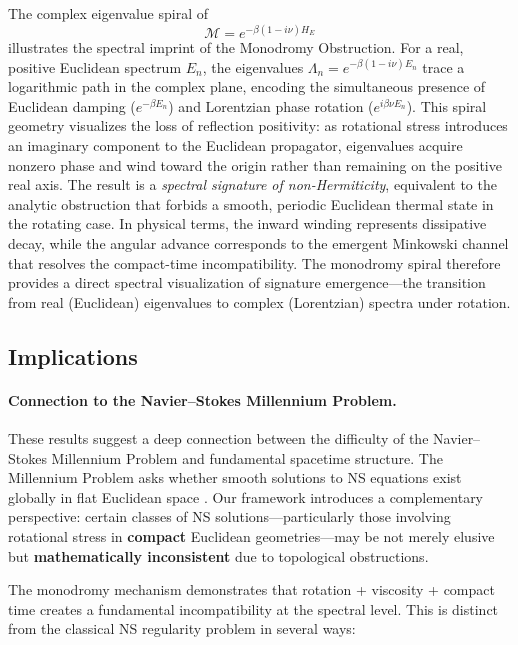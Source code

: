\documentclass[11pt]{article}
\begin{document}
The complex eigenvalue spiral of
\[
\mathcal{M} = e^{-\beta (1 - i\nu) H_E}
\]
illustrates the spectral imprint of the Monodromy Obstruction.
For a real, positive Euclidean spectrum \(E_n\), the eigenvalues
\(\Lambda_n = e^{-\beta(1 - i\nu)E_n}\)
trace a logarithmic path in the complex plane, encoding the simultaneous presence of Euclidean damping (\(e^{-\beta E_n}\)) and Lorentzian phase rotation (\(e^{i\beta\nu E_n}\)).
This spiral geometry visualizes the loss of reflection positivity: as rotational stress introduces an imaginary component to the Euclidean propagator, eigenvalues acquire nonzero phase and wind toward the origin rather than remaining on the positive real axis.
The result is a \emph{spectral signature of non-Hermiticity}, equivalent to the analytic obstruction that forbids a smooth, periodic Euclidean thermal state in the rotating case.
In physical terms, the inward winding represents dissipative decay, while the angular advance corresponds to the emergent Minkowski channel that resolves the compact-time incompatibility.
The monodromy spiral therefore provides a direct spectral visualization of signature emergence—the transition from real (Euclidean) eigenvalues to complex (Lorentzian) spectra under rotation.


\subsection{Implications}

\paragraph{Connection to the Navier--Stokes Millennium Problem.}
These results suggest a deep connection between the difficulty of the Navier--Stokes 
Millennium Problem and fundamental spacetime structure. The Millennium Problem asks 
whether smooth solutions to NS equations exist globally in flat Euclidean space 
\cite{NavierStokesMillennium}. Our framework introduces a complementary perspective: 
certain classes of NS solutions---particularly those involving rotational stress in 
\textbf{compact} Euclidean geometries---may be not merely elusive but 
\textbf{mathematically inconsistent} due to topological obstructions.

The monodromy mechanism demonstrates that rotation + viscosity + compact time creates 
a fundamental incompatibility at the spectral level. This is distinct from the 
classical NS regularity problem in several ways:
\end{document}
